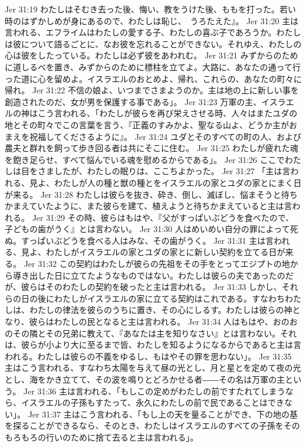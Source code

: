 Jer 31:19  わたしはそむき去った後、悔い、教をうけた後、ももを打った。若い時のはずかしめが身にあるので、わたしは恥じ、　うろたえた』。
Jer 31:20  主は言われる、エフライムはわたしの愛する子、わたしの喜ぶ子であろうか。わたしは彼について語るごとに、なお彼を忘れることができない。それゆえ、わたしの心は彼をしたっている。わたしは必ず彼をあわれむ。
Jer 31:21  みずからのために道しるべを置き、みずからのために標柱を立てよ。大路に、あなたの通って行った道に心を留めよ。イスラエルのおとめよ、帰れ、これらの、あなたの町々に帰れ。
Jer 31:22  不信の娘よ、いつまでさまようのか。主は地の上に新しい事を創造されたのだ、女が男を保護する事である」。
Jer 31:23  万軍の主、イスラエルの神はこう言われる、「わたしが彼らを再び栄えさせる時、人々はまたユダの地とその町々でこの言葉を言う、『正義のすみかよ、聖なる山よ、どうか主がおまえを祝福してくださるように』。
Jer 31:24  ユダとそのすべての町の人、および農夫と群れを飼って歩き回る者は共にそこに住む。
Jer 31:25  わたしが疲れた魂を飽き足らせ、すべて悩んでいる魂を慰めるからである」。
Jer 31:26  ここでわたしは目をさましたが、わたしの眠りは、ここちよかった。
Jer 31:27  「主は言われる、見よ、わたしが人の種と獣の種とをイスラエルの家とユダの家とにまく日が来る。
Jer 31:28  わたしは彼らを抜き、砕き、倒し、滅ぼし、悩まそうと待ちかまえていたように、また彼らを建て、植えようと待ちかまえていると主は言われる。
Jer 31:29  その時、彼らはもはや、『父がすっぱいぶどうを食べたので、子どもの歯がうく』とは言わない。
Jer 31:30  人はめいめい自分の罪によって死ぬ。すっぱいぶどうを食べる人はみな、その歯がうく。
Jer 31:31  主は言われる、見よ、わたしがイスラエルの家とユダの家とに新しい契約を立てる日が来る。
Jer 31:32  この契約はわたしが彼らの先祖をその手をとってエジプトの地から導き出した日に立てたようなものではない。わたしは彼らの夫であったのだが、彼らはそのわたしの契約を破ったと主は言われる。
Jer 31:33  しかし、それらの日の後にわたしがイスラエルの家に立てる契約はこれである。すなわちわたしは、わたしの律法を彼らのうちに置き、その心にしるす。わたしは彼らの神となり、彼らはわたしの民となると主は言われる。
Jer 31:34  人はもはや、おのおのその隣とその兄弟に教えて、『あなたは主を知りなさい』とは言わない。それは、彼らが小より大に至るまで皆、わたしを知るようになるからであると主は言われる。わたしは彼らの不義をゆるし、もはやその罪を思わない」。
Jer 31:35  主はこう言われる、すなわち太陽を与えて昼の光とし、月と星とを定めて夜の光とし、海をかき立てて、その波を鳴りとどろかせる者――その名は万軍の主という。
Jer 31:36  主は言われる、「もしこの定めがわたしの前ですたれてしまうなら、イスラエルの子孫もすたって、永久にわたしの前で民であることはできない」。
Jer 31:37  主はこう言われる、「もし上の天を量ることができ、下の地の基を探ることができるなら、そのとき、わたしはイスラエルのすべての子孫をそのもろもろの行いのために捨て去ると主は言われる」。
